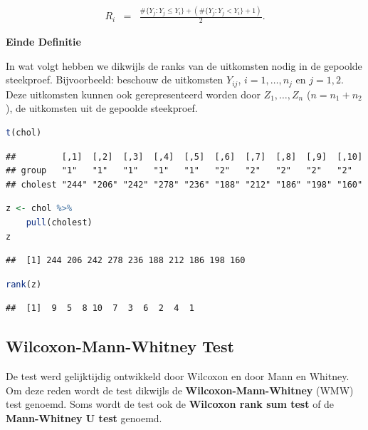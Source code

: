 \documentclass[
  12pt,dutch,coursenotes]{book}
\theoremstyle{definition}
\theoremstyle{definition}
\theoremstyle{definition}
\theoremstyle{definition}
\theoremstyle{remark}
\begin{document}
\begin{eqnarray*}
  R_i &=& \frac{ \#\{Y_j: Y_j\leq Y_i\} + ( \#\{Y_j: Y_j < Y_i\} +1)}{2}.
\end{eqnarray*}

\textbf{Einde Definitie}

In wat volgt hebben we dikwijls de ranks van de uitkomsten nodig in de gepoolde steekproef. Bijvoorbeeld: beschouw de uitkomsten \(Y_{ij}\), \(i=1,\ldots, n_j\) en \(j=1,2\).
Deze uitkomsten kunnen ook gerepresenteerd worden door \(Z_1,\ldots, Z_n\) (\(n=n_1+n_2\)), de uitkomsten uit de gepoolde steekproef.

\begin{lstlisting}[language=R]
t(chol)
\end{lstlisting}

\begin{lstlisting}
##         [,1]  [,2]  [,3]  [,4]  [,5]  [,6]  [,7]  [,8]  [,9]  [,10]
## group   "1"   "1"   "1"   "1"   "1"   "2"   "2"   "2"   "2"   "2"  
## cholest "244" "206" "242" "278" "236" "188" "212" "186" "198" "160"
\end{lstlisting}

\begin{lstlisting}[language=R]
z <- chol %>%
    pull(cholest)
z
\end{lstlisting}

\begin{lstlisting}
##  [1] 244 206 242 278 236 188 212 186 198 160
\end{lstlisting}

\begin{lstlisting}[language=R]
rank(z)
\end{lstlisting}

\begin{lstlisting}
##  [1]  9  5  8 10  7  3  6  2  4  1
\end{lstlisting}

\hypertarget{wilcoxon-mann-whitney-test}{%
\subsection{Wilcoxon-Mann-Whitney Test}\label{wilcoxon-mann-whitney-test}}

De test werd gelijktijdig ontwikkeld door Wilcoxon en door Mann en Whitney. Om deze reden wordt de test dikwijls de \textbf{Wilcoxon-Mann-Whitney} (WMW) test genoemd. Soms wordt de test ook de \textbf{Wilcoxon rank sum test} of de \textbf{Mann-Whitney U test} genoemd.
\end{document}
